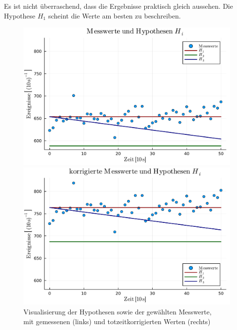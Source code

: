 \documentclass[12pt,a4paper]{scrartcl}
\numberwithin{equation}{section} %
\begin{document}
Es ist nicht überraschend, dass die Ergebnisse praktisch gleich aussehen. Die Hypothese $H_1$ scheint die Werte am besten zu beschreiben.

\begin{figure}[h!]
	\centering
	\begin{minipage}{0.49\textwidth}
		\includegraphics[width=\textwidth]{../media/B3.1/Hypothesen_plot.pdf}
	\end{minipage}
	\begin{minipage}{0.49\textwidth}
		\includegraphics[width=\textwidth]{../media/B3.1/Hypothesen_plot_corr.pdf}
	\end{minipage}
	\caption{Visualisierung der Hypothesen sowie der gewählten Messwerte,\\
		mit gemessenen (links) und totzeitkorrigierten Werten (rechts)}
	\label{abb:Hypothesen}
\end{figure}
\end{document}
